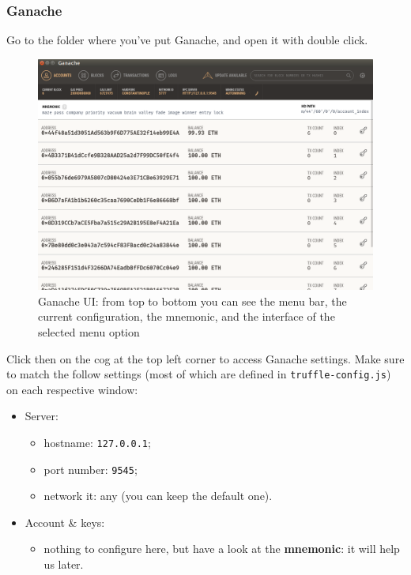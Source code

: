 \subsubsection{Ganache}
Go to the folder where you've put Ganache, and open it with double click.
\begin{figure}
	\centering
	\caption{Ganache UI: from top to bottom you can see the menu bar, the current configuration, the mnemonic, and the interface of the selected menu option}
	\includegraphics[scale=0.25]{res/images/ganache-ui.png}
\end{figure}

Click then on the cog at the top left corner to access Ganache settings.
Make sure to match the follow settings (most of which are defined in \texttt{truffle-config.js}) on each respective window:
\begin{itemize}
	\item Server:
	\begin{itemize}
		\item hostname: \texttt{127.0.0.1};
		\item port number: \texttt{9545};
		\item network it: any (you can keep the default one).
	\end{itemize}
	\item Account \& keys:
	\begin{itemize}
		\item nothing to configure here, but have a look at the \textbf{mnemonic}: it will help us later.
	\end{itemize}
\end{itemize}

